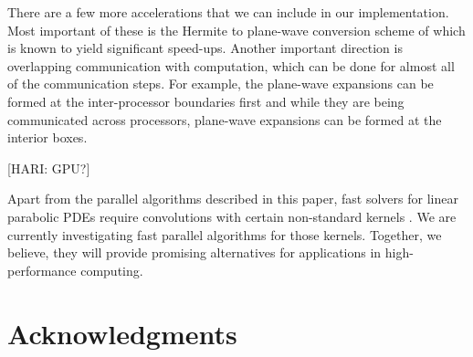 \documentclass[conference]{IEEEtran}
\begin{document}
There are a few more accelerations that we can include in our implementation. Most important of these is the Hermite to 
plane-wave conversion scheme of \cite{fggt} which is known to yield significant speed-ups. Another important direction
 is overlapping communication with computation, which can be done for almost all of the communication steps. For example, 
 the plane-wave expansions can be formed at the inter-processor boundaries first and while they are being communicated 
 across processors, plane-wave expansions can be formed at the interior boxes. 

[HARI: GPU?]

Apart from the parallel algorithms described in this paper, fast solvers for linear parabolic PDEs 
require convolutions with certain non-standard kernels \cite{li09, skv09}. We are currently investigating fast 
parallel algorithms for those kernels. Together, we believe, they will provide promising alternatives 
for applications in high-performance computing. 

\section*{Acknowledgments}




\end{document}
